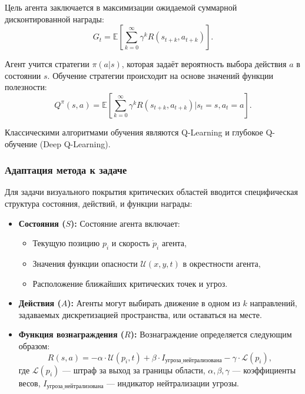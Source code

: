 Цель агента заключается в максимизации ожидаемой суммарной дисконтированной награды:
\begin{equation}
	G_t = \mathbb{E} \left[ \sum_{k=0}^{\infty} \gamma^k R(s_{t+k}, a_{t+k}) \right].
\end{equation}

Агент учится стратегии $\pi(a|s)$, которая задаёт вероятность выбора действия $a$ в состоянии $s$.
Обучение стратегии происходит на основе значений функции полезности:
\begin{equation}
	Q^\pi(s, a) = \mathbb{E} \left[ \sum_{k=0}^{\infty} \gamma^k R(s_{t+k}, a_{t+k}) \bigg| s_t = s, a_t = a \right].
\end{equation}

Классическими алгоритмами обучения являются Q-Learning и глубокое Q-обучение (Deep Q-Learning).

\subsubsection*{Адаптация метода к задаче}
Для задачи визуального покрытия критических областей вводится специфическая структура состояния, действий, и функции награды:
\begin{itemize}
	\item \textbf{Состояния ($S$):} Состояние агента включает:
	\begin{itemize}
		\item Текущую позицию $p_i$ и скорость $\dot{p}_i$ агента,
		\item Значения функции опасности $\mathcal{U}(x, y, t)$ в окрестности агента,
		\item Расположение ближайших критических точек и угроз.
	\end{itemize}
	\item \textbf{Действия ($A$):} Агенты могут выбирать движение в одном из $k$ направлений, задаваемых дискретизацией пространства, или оставаться на месте.
	\item \textbf{Функция вознаграждения ($R$):} Вознаграждение определяется следующим образом:
	\begin{equation}
		R(s, a) = -\alpha \cdot \mathcal{U}(p_i, t) + \beta \cdot I_{\text{угроза\_нейтрализована}} - \gamma \cdot \mathcal{L}(p_i),
	\end{equation}
	где $\mathcal{L}(p_i)$ — штраф за выход за границы области, $\alpha, \beta, \gamma$ — коэффициенты весов, $I_{\text{угроза\_нейтрализована}}$ — индикатор нейтрализации угрозы.
\end{itemize}

